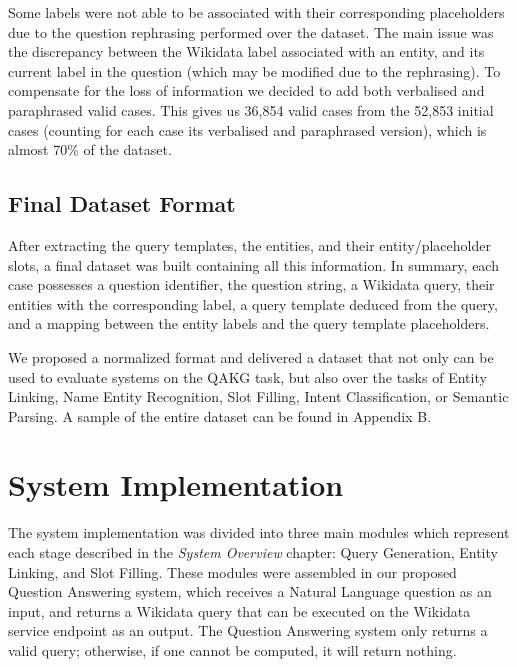 Some labels were not able to be associated with their corresponding placeholders due to the 
question rephrasing performed over the \LCQuADtwo{} dataset. The main issue was the discrepancy between the 
Wikidata label associated with an entity, and its current label in the question (which may be 
modified due to the rephrasing). To compensate for the loss of information we decided to add 
both verbalised and paraphrased valid cases. This gives us 36,854 valid cases from the 52,853 
initial cases (counting for each case its verbalised and paraphrased version), which is almost 
70\% of the dataset.

\subsection{Final Dataset Format}
\label{cap4:experimentalDesign/QaDataset/finalFormat}
After extracting the query templates, the entities, and their entity/placeholder slots, a final 
\LCQuADtwo{} dataset was built containing all this information. In summary, each case possesses a 
question identifier, the question string, a Wikidata \SPARQL{} query, their entities with the 
corresponding label, a query template deduced from the \SPARQL{} query, and a mapping between the 
entity labels and the query template placeholders. 

We proposed a normalized format and delivered a dataset that not only can be used to evaluate 
systems on the QAKG task, but also over the tasks of Entity Linking, Name Entity Recognition, 
Slot Filling, Intent Classification, or Semantic Parsing. A sample of the entire dataset can be 
found in Appendix B.

\section{System Implementation}
\label{cap4:experimentalDesign/systemImplementation}
The system implementation was divided into three main modules which represent each stage 
described in the \textit{System Overview} chapter: Query Generation, Entity Linking, and Slot 
Filling. These modules were assembled in our proposed Question Answering system, which receives 
a Natural Language question as an input, and returns a Wikidata \SPARQL{} query that can be executed 
on the Wikidata service endpoint as an output. The Question Answering system only returns a valid 
\SPARQL{} query; otherwise, if one cannot be computed, it will return nothing.

